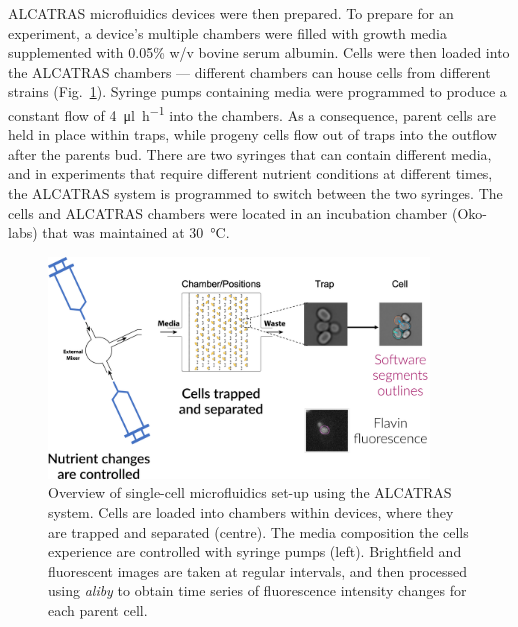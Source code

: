 ALCATRAS microfluidics \parencite{craneMicrofluidicSystemStudying2014} devices were then prepared.
To prepare for an experiment, a device's multiple chambers were filled with growth media supplemented with 0.05\% w/v bovine serum albumin.
Cells were then loaded into the ALCATRAS chambers --- different chambers can house cells from different strains (Fig.\ \ref{fig:methods-microfluidics}).
Syringe pumps containing media were programmed to produce a constant flow of \SI{4}{\micro\litre~\hour^{-1}} into the chambers.
As a consequence, parent cells are held in place within traps, while progeny cells flow out of traps into the outflow after the parents bud.
There are two syringes that can contain different media, and in experiments that require different nutrient conditions at different times, the ALCATRAS system is programmed to switch between the two syringes.
The cells and ALCATRAS chambers were located in an incubation chamber (Oko-labs) that was maintained at \SI{30}{\celsius}.

\begin{figure}
  \centering
  \includegraphics[width=0.9\textwidth]{microfluidics.png}
  \caption[
    Overview of single-cell microfluidics set-up using the ALCATRAS system
  ]{
    Overview of single-cell microfluidics set-up using the ALCATRAS system.
    Cells are loaded into chambers within devices, where they are trapped and separated (centre).
    The media composition the cells experience are controlled with syringe pumps (left).
    Brightfield and fluorescent images are taken at regular intervals, and then processed using \textit{aliby} \parencite{munozgonzalezPhenotypingSingleCells2023} to obtain time series of fluorescence intensity changes for each parent cell.
  }
  \label{fig:methods-microfluidics}
\end{figure}

